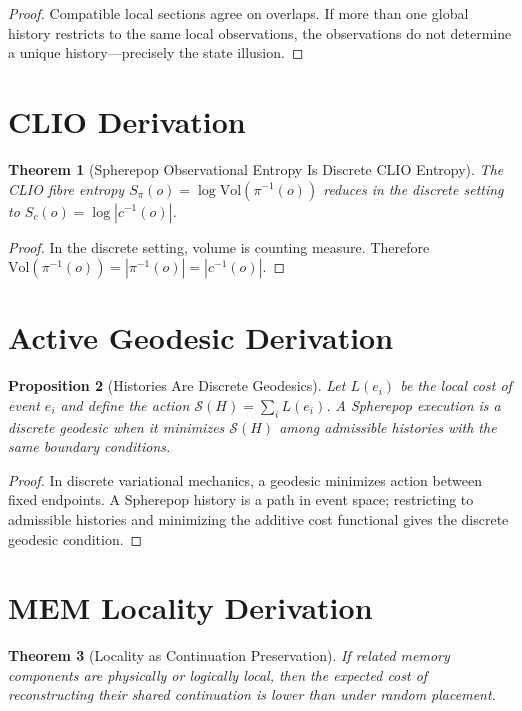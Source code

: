 \documentclass[12pt, a4paper, openany]{book}
\theoremstyle{plain}
\newtheorem{theorem}{Theorem}[chapter]
\newtheorem{proposition}[theorem]{Proposition}
\theoremstyle{definition}
\theoremstyle{remark}
\begin{document}
\begin{proof}
Compatible local sections agree on overlaps. If more than one global history
restricts to the same local observations, the observations do not determine a
unique history---precisely the state illusion.
\end{proof}

\section{CLIO Derivation}

\begin{theorem}[Spherepop Observational Entropy Is Discrete CLIO Entropy]
The CLIO fibre entropy $S_\pi(o) = \log \mathrm{Vol}(\pi^{-1}(o))$ reduces in
the discrete setting to $S_c(o) = \log |c^{-1}(o)|$.
\end{theorem}

\begin{proof}
In the discrete setting, volume is counting measure. Therefore
$\mathrm{Vol}(\pi^{-1}(o)) = |\pi^{-1}(o)| = |c^{-1}(o)|$.
\end{proof}

\section{Active Geodesic Derivation}

\begin{proposition}[Histories Are Discrete Geodesics]
Let $L(e_i)$ be the local cost of event $e_i$ and define the action
$\mathcal{S}(H) = \sum_i L(e_i)$. A Spherepop execution is a discrete geodesic
when it minimizes $\mathcal{S}(H)$ among admissible histories with the same
boundary conditions.
\end{proposition}

\begin{proof}
In discrete variational mechanics, a geodesic minimizes action between fixed
endpoints. A Spherepop history is a path in event space; restricting to admissible
histories and minimizing the additive cost functional gives the discrete geodesic
condition.
\end{proof}

\section{MEM Locality Derivation}

\begin{theorem}[Locality as Continuation Preservation]
If related memory components are physically or logically local, then the expected
cost of reconstructing their shared continuation is lower than under random
placement.
\end{theorem}
\end{document}

